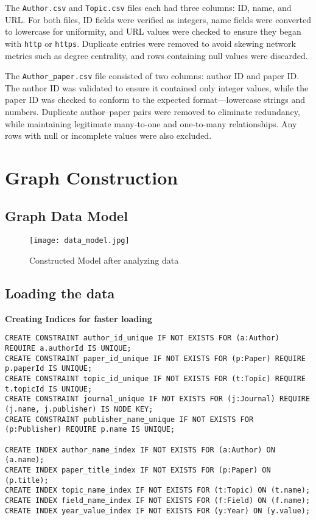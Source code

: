 \documentclass{article}
\theoremstyle{mytheoremstyle}
\theoremstyle{mytheoremstyle}
\theoremstyle{myproblemstyle}
\begin{document}
The \texttt{Author.csv} and \texttt{Topic.csv} files each had three columns: ID, name, and URL. For both files, ID fields were verified as integers, name fields were converted to lowercase for uniformity, and URL values were checked to ensure they began with \texttt{http} or \texttt{https}. Duplicate entries were removed to avoid skewing network metrics such as degree centrality, and rows containing null values were discarded.

The \texttt{Author\_paper.csv} file consisted of two columns: author ID and paper ID. The author ID was validated to ensure it contained only integer values, while the paper ID was checked to conform to the expected format—lowercase strings and numbers. Duplicate author–paper pairs were removed to eliminate redundancy, while maintaining legitimate many-to-one and one-to-many relationships. Any rows with null or incomplete values were also excluded.


\section{Graph Construction}

\subsection{Graph Data Model}
\begin{figure}[h!]
    \centering
    \texttt{[image: data\_model.jpg]}
    \caption{Constructed Model after analyzing data}
    \label{fig:enter-label}
\end{figure}

\subsection{Loading the data}

\textbf{Creating Indices for faster loading}

\begin{lstlisting}[style=cypherstyle]
CREATE CONSTRAINT author_id_unique IF NOT EXISTS FOR (a:Author) REQUIRE a.authorId IS UNIQUE;
CREATE CONSTRAINT paper_id_unique IF NOT EXISTS FOR (p:Paper) REQUIRE p.paperId IS UNIQUE;
CREATE CONSTRAINT topic_id_unique IF NOT EXISTS FOR (t:Topic) REQUIRE t.topicId IS UNIQUE;
CREATE CONSTRAINT journal_unique IF NOT EXISTS FOR (j:Journal) REQUIRE (j.name, j.publisher) IS NODE KEY;
CREATE CONSTRAINT publisher_name_unique IF NOT EXISTS FOR (p:Publisher) REQUIRE p.name IS UNIQUE;

CREATE INDEX author_name_index IF NOT EXISTS FOR (a:Author) ON (a.name);
CREATE INDEX paper_title_index IF NOT EXISTS FOR (p:Paper) ON (p.title);
CREATE INDEX topic_name_index IF NOT EXISTS FOR (t:Topic) ON (t.name);
CREATE INDEX field_name_index IF NOT EXISTS FOR (f:Field) ON (f.name);
CREATE INDEX year_value_index IF NOT EXISTS FOR (y:Year) ON (y.value);
\end{lstlisting}
\end{document}
